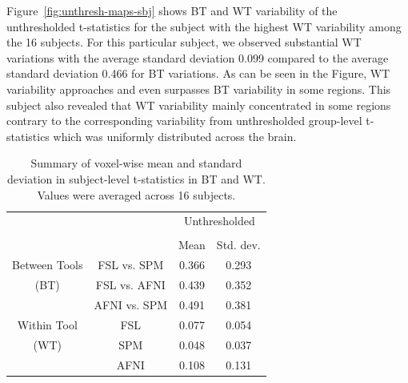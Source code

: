 \documentclass[conference]{IEEEtran}
\begin{document}
  Figure~\ref{fig:unthresh-maps-sbj} shows BT and WT variability of the
  unthresholded t-statistics for the subject with the highest WT
  variability among the 16 subjects.
  For this particular subject, we observed substantial WT variations with the average standard deviation 0.099 compared to 
  the average standard deviation 0.466 for BT variations.
  As can be seen in the Figure, WT variability approaches and even surpasses BT variability in some regions.
  This subject also revealed that WT variability mainly concentrated in some regions  
  contrary to the corresponding variability from unthresholded group-level t-statistics which was uniformly distributed across the brain.

\setlength{\tabcolsep}{5pt}
\begin{table}[h]
    \centering
    \begin{tabular}{cccc}
        \toprule
        \multirow{2}{*}{}& {} & \multicolumn{2}{c}{Unthresholded} \\
        \cmidrule{3-4} \\
        {} & {} & Mean & Std. dev. \\
        \midrule
        \rowcolor{lightgray}
        {Between Tools} & FSL vs. SPM        &  0.366       & 0.293     \\
        \rowcolor{lightgray}
        {(BT)} & FSL vs. AFNI                &  0.439       & 0.352     \\
        \rowcolor{lightgray}
        {} & AFNI vs. SPM                    &  0.491       & 0.381     \\
        {Within Tool} & FSL                  &  0.077       & 0.054     \\
        {(WT)}   & SPM                       &  0.048       & 0.037     \\
        {}   & AFNI                          &  0.108       & 0.131     \\
        \bottomrule
    \end{tabular}
    \caption{Summary of voxel-wise mean and standard deviation in subject-level t-statistics in BT and WT. Values were averaged across 16 subjects.}
    \label{table:unthresh-maps-subjects}
\end{table}
\end{document}

